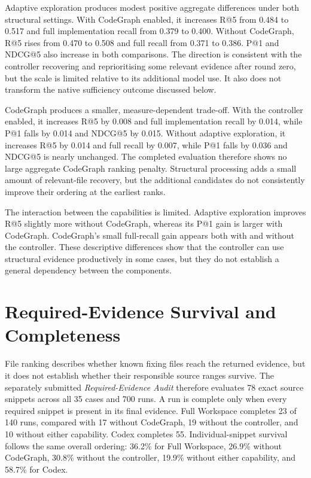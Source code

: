 Adaptive exploration produces modest positive aggregate differences under both structural settings. With CodeGraph enabled, it increases R@5 from 0.484 to 0.517 and full implementation recall from 0.379 to 0.400. Without CodeGraph, R@5 rises from 0.470 to 0.508 and full recall from 0.371 to 0.386. P@1 and NDCG@5 also increase in both comparisons. The direction is consistent with the controller recovering and reprioritising some relevant evidence after round zero, but the scale is limited relative to its additional model use. It also does not transform the native sufficiency outcome discussed below.

CodeGraph produces a smaller, measure-dependent trade-off. With the controller enabled, it increases R@5 by 0.008 and full implementation recall by 0.014, while P@1 falls by 0.014 and NDCG@5 by 0.015. Without adaptive exploration, it increases R@5 by 0.014 and full recall by 0.007, while P@1 falls by 0.036 and NDCG@5 is nearly unchanged. The completed evaluation therefore shows no large aggregate CodeGraph ranking penalty. Structural processing adds a small amount of relevant-file recovery, but the additional candidates do not consistently improve their ordering at the earliest ranks.

The interaction between the capabilities is limited. Adaptive exploration improves R@5 slightly more without CodeGraph, whereas its P@1 gain is larger with CodeGraph. CodeGraph's small full-recall gain appears both with and without the controller. These descriptive differences show that the controller can use structural evidence productively in some cases, but they do not establish a general dependency between the components.

\section{Required-Evidence Survival and Completeness}\label{sec:required-evidence-survival-and-completeness}

File ranking describes whether known fixing files reach the returned evidence, but it does not establish whether their responsible source ranges survive. The separately submitted \emph{Required-Evidence Audit} therefore evaluates 78 exact source snippets across all 35 cases and 700 runs. A run is complete only when every required snippet is present in its final evidence. Full Workspace completes 23 of 140 runs, compared with 17 without CodeGraph, 19 without the controller, and 10 without either capability. Codex completes 55. Individual-snippet survival follows the same overall ordering: 36.2\% for Full Workspace, 26.9\% without CodeGraph, 30.8\% without the controller, 19.9\% without either capability, and 58.7\% for Codex.

